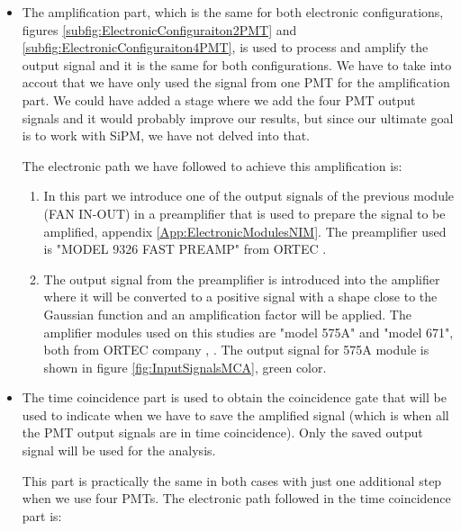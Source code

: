 \begin{itemize}

\item{} The amplification part, which is the same for both electronic configurations, figures \ref{subfig:ElectronicConfiguraiton2PMT} and \ref{subfig:ElectronicConfiguraiton4PMT}, is used to process and amplify the output signal and it is the same for both configurations. We have to take into accout that we have only used the signal from one PMT for the amplification part. We could have added a stage where we add the four PMT output signals and it would probably improve our results, but since our ultimate goal is to work with SiPM, we have not delved into that.

The electronic path we have followed to achieve this amplification is:

\begin{enumerate}

\item{} In this part we introduce one of the output signals of the previous module (FAN IN-OUT) in a preamplifier that is used to prepare the signal to be amplified, appendix \ref{App:ElectronicModulesNIM}. The preamplifier used is "MODEL 9326 FAST PREAMP" from ORTEC \cite{DataSheetPreAmp}.

\item{} The output signal from the preamplifier is introduced into the amplifier where it will be converted to a positive signal with a shape close to the Gaussian function and an amplification factor will be applied. The amplifier modules used on this studies are "model 575A" and "model 671", both from ORTEC company \cite{DataSheet575Amp}, \cite{DataSheet671Amp}. The output signal for 575A module is shown in figure \ref{fig:InputSignalsMCA}, green color.

\end{enumerate}

\item{} The time coincidence part is used to obtain the coincidence gate that will be used to indicate when we have to save the amplified signal (which is when all the PMT output signals are in time coincidence). Only the saved output signal will be used for the analysis. 

This part is practically the same in both cases with just one additional step when we use four PMTs. The electronic path followed in the time coincidence part is:

\begin{enumerate}


\end{enumerate}
\end{itemize}
